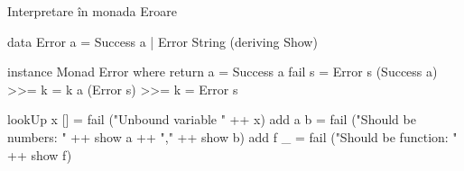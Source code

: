 \documentclass[xcolor=pdftex,romanian,colorlinks]{beamer}
\begin{document}
\begin{frame}[fragile]{Interpretare în monada Eroare}
\begin{asciihs}
data Error a = Success a | Error String
  (deriving Show)

instance Monad Error where
  return a = Success a
  fail   s = Error s
  (Success a) >>= k = k a
  (Error s)   >>= k = Error s
  
  
lookUp x [] = fail ("Unbound variable " ++ x)
add a b   = fail ("Should be numbers: " ++ show a ++ 
                                    "," ++ show b)
add f _   = fail ("Should be function: " ++ show f)
\end{asciihs}
\end{frame}

\end{document}
